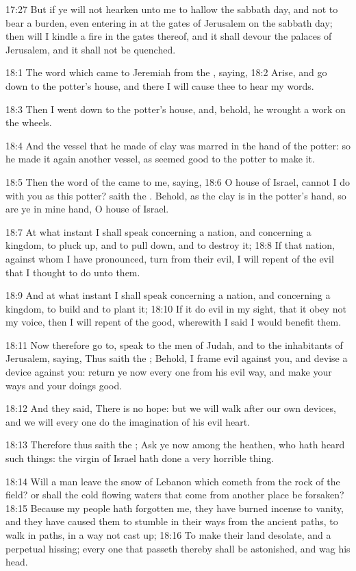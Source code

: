 17:27 But if ye will not hearken unto me to hallow the sabbath day, and not to bear a burden, even entering in at the gates of Jerusalem on the sabbath day; then will I kindle a fire in the gates thereof, and it shall devour the palaces of Jerusalem, and it shall not be quenched.

18:1 The word which came to Jeremiah from the \LORD, saying, 18:2 Arise, and go down to the potter's house, and there I will cause thee to hear my words.

18:3 Then I went down to the potter's house, and, behold, he wrought a work on the wheels.

18:4 And the vessel that he made of clay was marred in the hand of the potter: so he made it again another vessel, as seemed good to the potter to make it.

18:5 Then the word of the \LORD came to me, saying, 18:6 O house of Israel, cannot I do with you as this potter? saith the \LORD. Behold, as the clay is in the potter's hand, so are ye in mine hand, O house of Israel.

18:7 At what instant I shall speak concerning a nation, and concerning a kingdom, to pluck up, and to pull down, and to destroy it; 18:8 If that nation, against whom I have pronounced, turn from their evil, I will repent of the evil that I thought to do unto them.

18:9 And at what instant I shall speak concerning a nation, and concerning a kingdom, to build and to plant it; 18:10 If it do evil in my sight, that it obey not my voice, then I will repent of the good, wherewith I said I would benefit them.

18:11 Now therefore go to, speak to the men of Judah, and to the inhabitants of Jerusalem, saying, Thus saith the \LORD; Behold, I frame evil against you, and devise a device against you: return ye now every one from his evil way, and make your ways and your doings good.

18:12 And they said, There is no hope: but we will walk after our own devices, and we will every one do the imagination of his evil heart.

18:13 Therefore thus saith the \LORD; Ask ye now among the heathen, who hath heard such things: the virgin of Israel hath done a very horrible thing.

18:14 Will a man leave the snow of Lebanon which cometh from the rock of the field? or shall the cold flowing waters that come from another place be forsaken?  18:15 Because my people hath forgotten me, they have burned incense to vanity, and they have caused them to stumble in their ways from the ancient paths, to walk in paths, in a way not cast up; 18:16 To make their land desolate, and a perpetual hissing; every one that passeth thereby shall be astonished, and wag his head.

